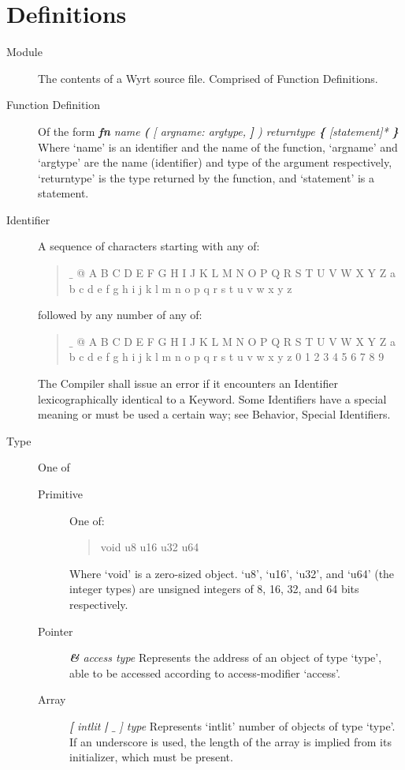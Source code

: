 \documentclass{article}
\begin{document}
\section{Definitions}
	\begin{description}
	\item[Module] The contents of a Wyrt source file. Comprised of Function Definitions.
		
	\item[Function Definition] Of the form \textit{\textbf{fn} name \textbf ( [ argname: argtype, \textbf ] ) returntype \textbf \{ [statement]* \textbf \} } \\
		Where `name' is an identifier and the name of the function, `argname' and `argtype' are the name (identifier) and type of the argument respectively, `returntype' is the type returned by the function, and `statement' is a statement.

	\item[Identifier] A sequence of characters starting with any of:
		\begin{quote}
		$\_$ @ A B C D E F G H I J K L M N O P Q R S T U V W X Y Z a b c d e f g h i j k l m n o p q r s t u v w x y z
		\end{quote}
		followed by any number of any of:
		\begin{quote}
		$\_$ @ A B C D E F G H I J K L M N O P Q R S T U V W X Y Z a b c d e f g h i j k l m n o p q r s t u v w x y z 0 1 2 3 4 5 6 7 8 9
		\end{quote}
		The Compiler shall issue an error if it encounters an Identifier lexicographically identical to a Keyword. Some Identifiers have a special meaning or must be used a certain way; see Behavior, Special Identifiers.

	\item[Type] One of
		\begin{description}
		\item[Primitive] One of:
			\begin{quote}
			void u8 u16 u32 u64
			\end{quote}
			Where `void' is a zero-sized object.
				`u8', `u16', `u32', and `u64' (the integer types) are unsigned integers of 8, 16, 32, and 64 bits respectively.

		\item[Pointer] \textit{\textbf \& access type}
			Represents the address of an object of type `type', able to be accessed according to access-modifier `access'.

		\item[Array] \textit{\textbf [ intlit \textbf | $\_$ ] type}
			Represents `intlit' number of objects of type `type'. If an underscore is used, the length of the array is implied from its initializer, which must be present.


\end{description}
\end{description}
\end{document}

